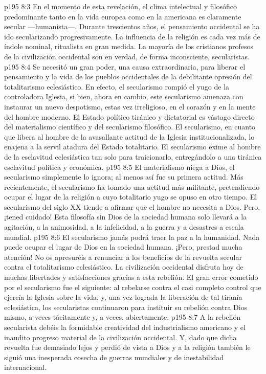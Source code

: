 \vs p195 8:3 En el momento de esta revelación, el clima intelectual y filosófico predominante tanto en la vida europea como en la americana es claramente secular ---humanista---. Durante trescientos años, el pensamiento occidental se ha ido secularizando progresivamente. La influencia de la religión es cada vez más de índole nominal, ritualista en gran medida. La mayoría de los cristianos profesos de la civilización occidental son en verdad, de forma inconsciente, secularistas.
\vs p195 8:4 Se necesitó un gran poder, una causa extraordinaria, para liberar el pensamiento y la vida de los pueblos occidentales de la debilitante opresión del totalitarismo eclesiástico. En efecto, el secularismo rompió el yugo de la controladora Iglesia, si bien, ahora en cambio, este secularismo amenaza con instaurar un nuevo despotismo, estas vez irreligioso, en el corazón y en la mente del hombre moderno. El Estado político tiránico y dictatorial es vástago directo del materialismo científico y del secularismo filosófico. El secularismo, en cuanto que libera al hombre de la avasallante actitud de la Iglesia institucionalizada, lo enajena a la servil atadura del Estado totalitario. El secularismo exime al hombre de la esclavitud eclesiástica tan solo para traicionarlo, entregándolo a una tiránica esclavitud política y económica.
\vs p195 8:5 \pc El materialismo niega a Dios, el secularismo simplemente lo ignora; al menos así fue su primera actitud. Más recientemente, el secularismo ha tomado una actitud más militante, pretendiendo ocupar el lugar de la religión a cuyo totalitario yugo se opuso en otro tiempo. El secularismo del siglo XX tiende a afirmar que el hombre no necesita a Dios. Pero, ¡tened cuidado! Esta filosofía sin Dios de la sociedad humana solo llevará a la agitación, a la animosidad, a la infelicidad, a la guerra y a desastres a escala mundial.
\vs p195 8:6 \pc El secularismo jamás podrá traer la paz a la humanidad. Nada puede ocupar el lugar de Dios en la sociedad humana. ¡Pero, prestad mucha atención! No os apresuréis a renunciar a los beneficios de la revuelta secular contra el totalitarismo eclesiástico. La civilización occidental disfruta hoy de muchas libertades y satisfacciones gracias a esta rebelión. El gran error cometido por el secularismo fue el siguiente: al rebelarse contra el casi completo control que ejercía la Iglesia sobre la vida, y, una vez lograda la liberación de tal tiranía eclesiástica, los secularistas continuaron para instituir su rebelión contra Dios mismo, a veces tácitamente y, a veces, abiertamente.
\vs p195 8:7 A la rebelión secularista debéis la formidable creatividad del industrialismo americano y el inaudito progreso material de la civilización occidental. Y, dado que dicha revuelta fue demasiado lejos y perdió de vista a Dios y a la religión  también le siguió una inesperada cosecha de guerras mundiales y de inestabilidad internacional.

